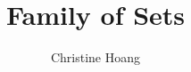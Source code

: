 \documentclass{article}
\title{Family of Sets}
\author{Christine Hoang}
\begin{document}
\maketitle

\section{}
\end{document}

